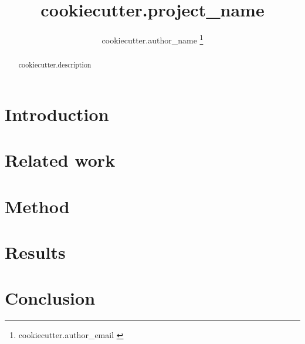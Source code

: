 \documentclass{article}
\title{ {{ cookiecutter.project_name }} }
\author{ {{ cookiecutter.author_name }} \thanks{ {{ cookiecutter.author_email }} } }
\date{}
\begin{document}
\maketitle

\begin{abstract}
{{ cookiecutter.description }}
\end{abstract}

\section{Introduction}

\section{Related work}

\section{Method}

\section{Results}

\section{Conclusion}

\printbibliography
\end{document}
